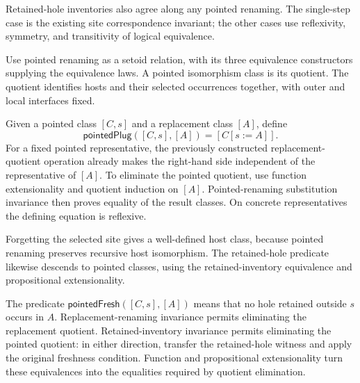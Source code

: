 Retained-hole inventories also agree along any pointed renaming.
The single-step case is the existing site correspondence invariant;
the other cases use reflexivity, symmetry, and transitivity of logical
equivalence.

\begin{definition}\label{term:pointed-class}
Use pointed renaming as a setoid relation, with its three equivalence
constructors supplying the equivalence laws. A pointed isomorphism
class is its quotient. The quotient identifies hosts and their selected
occurrences together, with outer and local interfaces fixed.
\end{definition}

\begin{definition}\label{term:pointed-plug}
Given a pointed class $[C,s]$ and a replacement class $[A]$, define
\[
          \mathsf{pointedPlug}([C,s],[A])=[C[s:=A]].
\]
For a fixed pointed representative, the previously constructed
replacement-quotient operation already makes the right-hand side
independent of the representative of $[A]$. To eliminate the pointed
quotient, use function extensionality and quotient induction on $[A]$.
Pointed-renaming substitution invariance then proves equality of the
result classes. On concrete representatives the defining equation is
reflexive.
\end{definition}

Forgetting the selected site gives a well-defined host class, because
pointed renaming preserves recursive host isomorphism.
The retained-hole predicate likewise descends to pointed classes,
using the retained-inventory equivalence and propositional extensionality.

\begin{definition}\label{term:pointed-freshness}
The predicate $\mathsf{pointedFresh}([C,s],[A])$ means that no hole
retained outside $s$ occurs in $A$. Replacement-renaming invariance
permits eliminating the replacement quotient. Retained-inventory
invariance permits eliminating the pointed quotient: in either
direction, transfer the retained-hole witness and apply the original
freshness condition. Function and propositional extensionality turn
these equivalences into the equalities required by quotient elimination.
\end{definition}

